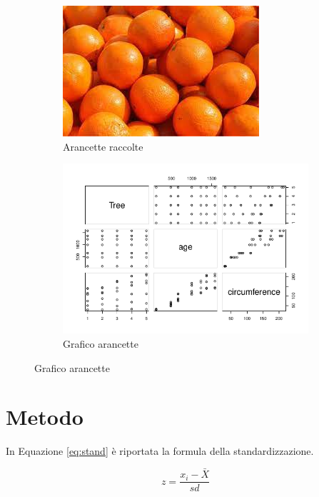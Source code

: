 \documentclass[
]{article}
\begin{document}
\begin{figure}
\centering 
\begin{subfigure}{0.3\textwidth}

\includegraphics[width=0.8\linewidth]{img/Arance} 
\caption{Arancette raccolte} 
\label{sub:arance}
\end{subfigure} 
\begin{subfigure}{0.3\textwidth} 

\includegraphics[width=0.8\linewidth]{Arancette_latex_files/figure-latex/unnamed-chunk-3-1} 
\caption{Grafico arancette} 
\label{sub:grafico} 
\end{subfigure} 
\end{figure}

\newpage

\hypertarget{metodo}{%
\section{Metodo}\label{metodo}}

In Equazione \ref{eq:stand} è riportata la formula della
standardizzazione.

\begin{equation}
\label{eq:stand}
z=\frac{x_i-\bar{X}}{sd}
\end{equation}
\end{document}
